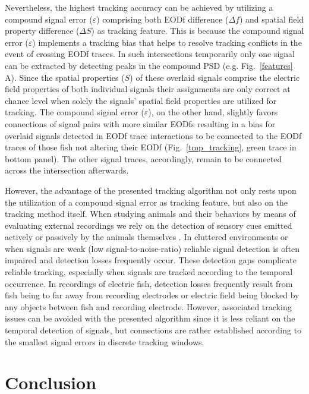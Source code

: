 \documentclass[11pt,pdftex]{article}
\newcommand{\panel}[1]{\textsf{#1}}
\newcommand{\fref}[1]{\textup{\ref{#1}}}
\newcommand{\subfref}[2]{\textup{\ref{#1}}\,\panel{#2}}
\newcommand{\fig}{Fig.}
\newcommand{\figref}[1]{\fig~\fref{#1}}
\newcommand{\subfigref}[2]{\fig~\subfref{#1}{#2}}
\begin{document}
Nevertheless, the highest tracking accuracy can be achieved by utilizing a compound signal error ($\varepsilon$) comprising both EODf difference ($\Delta f$) and spatial field property difference ($\Delta S$) as tracking feature. This is because the compound signal error ($\varepsilon$) implements a tracking bias that helps to resolve tracking conflicts in the event of crossing EODf traces. In such intersections temporarily only one signal can be extracted by detecting peaks in the compound PSD (e.g. \subfigref{features}{A}). Since the spatial properties ($S$) of these overlaid signals comprise the electric field properties of both individual signals their assignments are only correct at chance level when solely the signals' spatial field properties are utilized for tracking. The compound signal error ($\varepsilon$), on the other hand, slightly favors connections of signal pairs with more similar EODfs resulting in a bias for overlaid signals detected in EODf trace interactions to be connected to the EODf traces of those fish not altering their EODf (\figref{tmp_tracking}, green trace in bottom panel). The other signal traces, accordingly, remain to be connected across the intersection afterwards. 

However, the advantage of the presented tracking algorithm not only rests upon the utilization of a compound signal error as tracking feature, but also on the tracking method itself. When studying animals and their behaviors by means of evaluating external recordings we rely on the detection of sensory cues emitted actively or passively by the animals themselves \citep{Dell2014, Hughey2018}. In cluttered environments or when signals are weak (low signal-to-noise-ratio) reliable signal detection is often impaired and detection losses frequently occur. These detection gaps complicate reliable tracking, especially when signals are tracked according to the temporal occurrence. In recordings of electric fish, detection losses frequently result from fish being to far away from recording electrodes or electric field being blocked by any objects between fish and recording electrode. However, associated tracking issues can be avoided with the presented algorithm since it is less reliant on the temporal detection of signals, but connections are rather established according to the smallest signal errors in discrete tracking windows.

\section{Conclusion}
\end{document}

